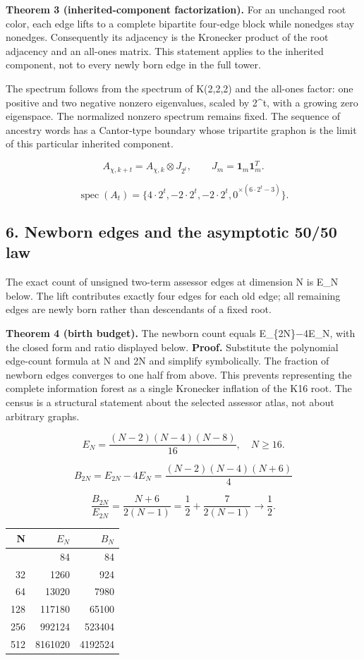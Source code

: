 \documentclass[
  10pt,
]{article}
\begin{document}
\textbf{Theorem 3 (inherited-component factorization).} For an unchanged
root color, each edge lifts to a complete bipartite four-edge block
while nonedges stay nonedges. Consequently its adjacency is the
Kronecker product of the root adjacency and an all-ones matrix. This
statement applies to the inherited component, not to every newly born
edge in the full tower.

The spectrum follows from the spectrum of K(2,2,2) and the all-ones
factor: one positive and two negative nonzero eigenvalues, scaled by
2\^{}t, with a growing zero eigenspace. The normalized nonzero spectrum
remains fixed. The sequence of ancestry words has a Cantor-type boundary
whose tripartite graphon is the limit of this particular inherited
component.

\[
A_{\chi,k+t}=A_{\chi,k}\otimes J_{2^t},\qquad J_m=\mathbf1_m\mathbf1_m^T.
\tag{10}
\]

\[
\operatorname{spec}(A_t)=\{4\cdot 2^t,-2\cdot2^t,-2\cdot2^t,0^{\times(6\cdot2^t-3)}\}.
\tag{11}
\]

\subsection{6. Newborn edges and the asymptotic 50/50
law}\label{newborn-edges-and-the-asymptotic-5050-law}

The exact count of unsigned two-term assessor edges at dimension N is
E\_N below. The lift contributes exactly four edges for each old edge;
all remaining edges are newly born rather than descendants of a fixed
root.

\textbf{Theorem 4 (birth budget).} The newborn count equals
E\_\{2N\}−4E\_N, with the closed form and ratio displayed below.
\textbf{Proof.} Substitute the polynomial edge-count formula at N and 2N
and simplify symbolically. The fraction of newborn edges converges to
one half from above. This prevents representing the complete information
forest as a single Kronecker inflation of the K16 root. The census is a
structural statement about the selected assessor atlas, not about
arbitrary graphs.

\[
E_N=\frac{(N-2)(N-4)(N-8)}{16},\quad N\ge16.
\tag{12}
\]

\[
B_{2N}=E_{2N}-4E_N=\frac{(N-2)(N-4)(N+6)}4
\tag{13}
\]

\[
\frac{B_{2N}}{E_{2N}}=\frac{N+6}{2(N-1)}=\frac12+\frac7{2(N-1)}\longrightarrow\frac12.
\tag{14}
\]

\begin{longtable}[]{@{}rrr@{}}
\toprule\noalign{}
N & \(E_N\) & \(B_N\) \\
\midrule\noalign{}
\endhead
\bottomrule\noalign{}
\endlastfoot
16 & 84 & 84 \\
32 & 1260 & 924 \\
64 & 13020 & 7980 \\
128 & 117180 & 65100 \\
256 & 992124 & 523404 \\
512 & 8161020 & 4192524 \\
\end{longtable}
\end{document}
